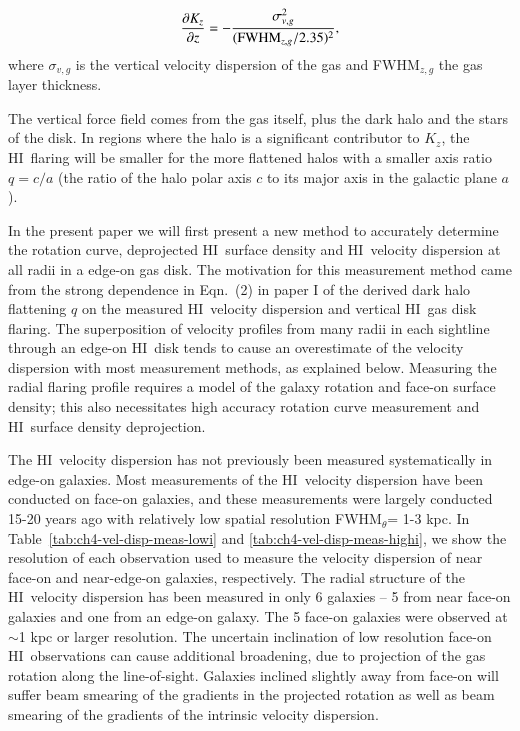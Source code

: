 \documentclass[traditabstract]{aa} %
\newcommand\HI{H{\small I}}
\begin{document}
\begin{equation}
\label{eq:ch1-hydro}
\frac{\partial K_z}{\partial z} = -
\frac{\sigma_{v,g}^2}{({\rm FWHM}_{z,g}/2.35)^2},
\end{equation}
where $\sigma_{v,g}$ is the vertical velocity dispersion of the gas and
FWHM$_{z,g}$ the gas layer thickness. 

The vertical force field comes from the gas itself, plus the dark halo
and the stars of the disk. In regions where the halo is a significant
contributor to $K_z$, the \HI\ flaring will be smaller for the more
flattened halos with a smaller axis ratio $q=c/a$ (the ratio of the halo 
polar axis $c$ to its major axis in the galactic plane $a$). 

In the present paper 
we will first present a new method to accurately determine the
rotation curve, deprojected \HI\ surface density and \HI\ velocity
dispersion at all radii in a edge-on gas disk. The motivation for 
this measurement method came from the strong dependence in
Eqn.~(2) in paper I of the derived dark halo flattening
$q$ on the measured \HI\ velocity dispersion and vertical \HI\
gas disk flaring. The
superposition of velocity profiles from many radii in each sightline
through an edge-on \HI\ disk tends to cause an overestimate of the
velocity dispersion with most measurement methods, as explained below.
Measuring the radial flaring profile requires a model of the galaxy
rotation and face-on surface density; this also necessitates high
accuracy rotation curve measurement and \HI\ surface density
deprojection.

The \HI\ velocity dispersion has not previously been measured
systematically in edge-on galaxies. Most measurements of the \HI\
velocity dispersion have been conducted on face-on galaxies, and these
measurements were largely conducted 15-20 years ago with relatively
low spatial resolution FWHM$_{\theta}$= 1-3 kpc. In
Table~\ref{tab:ch4-vel-disp-meas-lowi} and
\ref{tab:ch4-vel-disp-meas-highi}, we show the resolution of each
observation used to measure the velocity dispersion of near face-on
and near-edge-on galaxies, respectively. The radial structure of the
\HI\ velocity dispersion has been measured in only 6 galaxies -- 5 from
near face-on galaxies and one from an edge-on galaxy. The 5 face-on
galaxies were observed at $\sim$1 kpc or larger resolution. The
uncertain inclination of low resolution face-on \HI\ observations can
cause additional broadening, due to projection of the gas rotation
along the line-of-sight. Galaxies inclined slightly away from face-on
will suffer beam smearing of the gradients in the projected rotation
as well as beam smearing of the gradients of the intrinsic velocity
dispersion.
\end{document}
